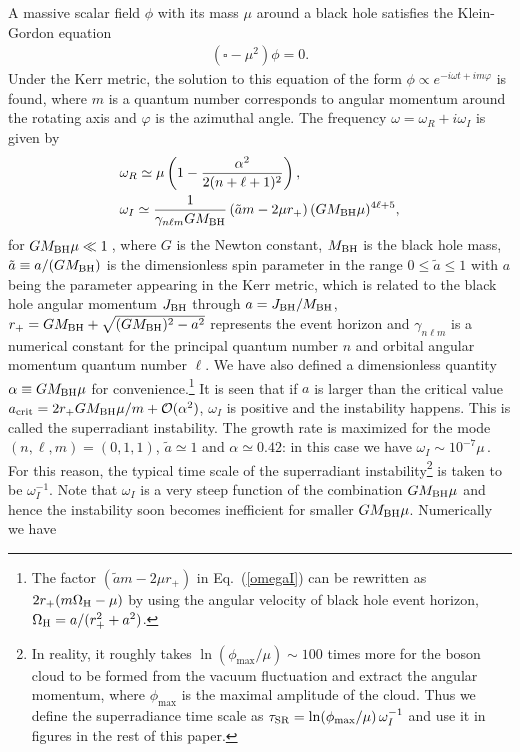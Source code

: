 \documentclass[%
 preprint,
 nofootinbib,
 amsmath,amssymb,
 aps,
 a4paper
]{revtex4-1}
\begin{document}
A massive scalar field $\phi$ with its mass $\mu$ around a black hole satisfies the Klein-Gordon equation
\begin{align}
	(\square - \mu^2) \phi=0.
\end{align}
Under the Kerr metric, the solution to this equation of the form $\phi\propto e^{-i\omega t+ im\varphi}$ is found, where $m$ is a quantum number corresponds to angular momentum around the rotating axis and $\varphi$ is the azimuthal angle. The frequency $\omega=\omega_R+ i\omega_I$ is given by
\begin{align}
	&\omega_R \simeq \mu\left(1-\frac{\alpha^2}{2(n+\ell+1)^2} \right),\\
	&\omega_I \simeq \frac{1}{\gamma_{n\ell m} GM_{\rm BH}} \left(\tilde a m-2\mu r_+ \right)(GM_{\rm BH} \mu)^{4\ell+5},
	\label{omegaI}
\end{align}
for $GM_{\rm BH}\mu\ll 1$\,\cite{Detweiler:1980uk}, where $G$ is the Newton constant, $M_{\rm BH}$ is the black hole mass, $\tilde a \equiv a/(GM_{\rm BH})$ is the dimensionless spin parameter in the range $0\leq \tilde a \leq 1$ with $a$ being the parameter appearing in the Kerr metric, which is related to the black hole angular momentum $J_{\rm BH}$ through $a=J_{\rm BH}/M_{\rm BH}$, $r_+= GM_{\rm BH} + \sqrt{(GM_{\rm BH})^2-a^2}$ represents the event horizon and $\gamma_{n\ell m}$ is a numerical constant for the principal quantum number $n$ and orbital angular momentum quantum number $\ell$. We have also defined a dimensionless quantity $\alpha \equiv GM_{\rm BH}\mu$ for convenience.\footnote{
	The factor $(\tilde a m-2\mu r_+)$ in Eq.~(\ref{omegaI}) can be rewritten as $2r_+(m\Omega_{\rm H} - \mu)$ by using the  angular velocity of black hole event horizon, $\Omega_{\rm H} =a/(r_+^2+a^2)$.
}
It is seen that if $a$ is larger than the critical value $a_{\rm crit} = 2r_+ GM_{\rm BH}\mu/m + \mathcal{O}(\alpha^2)$, $\omega_I$ is positive and the instability happens. This is called the superradiant instability. 
The growth rate is maximized for the mode $(n,\ell,m)=(0,1,1)$, $\tilde a \simeq 1$ and $\alpha \simeq 0.42$: in this case we have $\omega_I \sim 10^{-7} \mu$\,\cite{Dolan:2007mj}. For this reason, the typical time scale of the superradiant instability\footnote{In reality, it roughly takes $\ln(\phi_\text{max} / \mu) \sim 100$ times more for the boson cloud to be formed from the vacuum fluctuation and extract the angular momentum, where $\phi_\text{max}$ is the maximal amplitude of the cloud. 
Thus we define the superradiance time scale as $\tau_{\rm SR} =\ln(\phi_\text{max} / \mu)\,\omega_I^{-1}$ and use it in figures in the rest of this paper. 
}\label{footnote:SR} is taken to be $\omega_I^{-1}$. Note that $\omega_I$ is a very steep function of the combination $GM_{\rm BH} \mu$ and hence the instability soon becomes inefficient for smaller $GM_{\rm BH} \mu$.  Numerically we have
\end{document}

